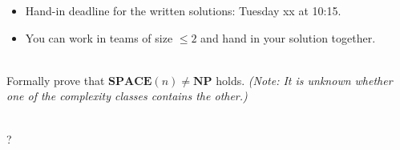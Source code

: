 \documentclass[english]{uebung_cs}
\begin{document}
\begin{itemize}
  \item Hand-in deadline for the written solutions: Tuesday xx at 10:15.
  \item You can work in teams of size $\le 2$ and hand in your solution together.
\end{itemize}

\begin{aufgabe}[Diagonalization]\mbox{}\\
    Formally prove that $\textbf{SPACE}(n)\ne\textbf{NP}$ holds.
    \textit{(Note: It is unknown whether one of the complexity classes contains the other.)}
\end{aufgabe}

\begin{aufgabe}[?]\mbox{}\\
?
\end{aufgabe}
\end{document}
